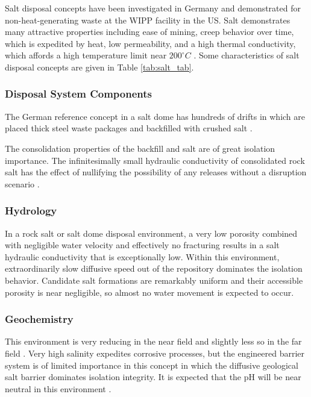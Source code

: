 Salt disposal concepts have been investigated in Germany and demonstrated for 
non-heat-generating waste at the \gls{WIPP} facility in the US. Salt 
demonstrates many attractive properties including ease of mining, creep behavior 
over time, which is expedited by heat, low permeability, and a high thermal 
conductivity, which affords a high temperature limit near $200^{\circ}C$ 
\cite{hardin_generic_2011}.
Some characteristics of salt disposal 
concepts are given in Table \ref{tab:salt_tab}.   



\subsubsection{Disposal System Components}

The German reference concept in a salt dome has hundreds of drifts in which 
are placed thick steel waste packages and backfilled with crushed salt 
\cite{von_lensa_red-impact_2008}. 

The consolidation properties of the backfill and salt are of great isolation 
importance. The infinitesimally small hydraulic conductivity of consolidated 
rock salt has the effect of nullifying the possibility of any releases without 
a disruption scenario \cite{brewitz_long-term_2002}.


\subsubsection{Hydrology}

In a rock salt or salt dome disposal environment, a very low porosity combined 
with negligible water velocity and effectively no fracturing results in a 
salt hydraulic conductivity that is exceptionally low. Within this environment,   
extraordinarily slow diffusive speed out of the repository dominates the 
isolation behavior. Candidate salt formations are remarkably uniform and their 
accessible porosity is near negligible, so almost no water movement is expected to 
occur. 

\subsubsection{Geochemistry}

This environment is very reducing in the near field and slightly less so in 
the far field \cite{clayton_generic_2011}. Very high salinity
expedites corrosive processes, but the engineered barrier system 
is of limited importance in this concept in which the diffusive geological salt barrier 
dominates isolation integrity.  It is expected that the pH will be near
neutral in this environment \cite{von_lensa_red-impact_2008, clayton_generic_2011}.

